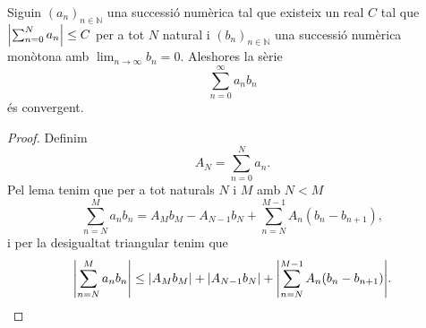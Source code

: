 \documentclass[../Apunts.tex]{subfiles}
\begin{document}
	\begin{theorem}
		\label{thm:Teorema de Dirichlet per sèries numèriques}
		Siguin \((a_{n})_{n\in\mathbb{N}}\) una successió numèrica tal que existeix un real \(C\) tal que \(\abs{\sum_{n=0}^{N}a_{n}}\leq C\) per a tot \(N\) natural i \((b_{n})_{n\in\mathbb{N}}\) una successió numèrica monòtona amb \(\lim_{n\to\infty}b_{n}=0\). Aleshores la sèrie
		\[\sum_{n=0}^{\infty}a_{n}b_{n}\]
		és convergent.
		\begin{proof}
			Definim
			\[A_{N}=\sum_{n=0}^{N}a_{n}.\]
			Pel lema  tenim que per a tot naturals \(N\) i \(M\) amb \(N<M\)
			\[\sum_{n=N}^{M}a_{n}b_{n}=A_{M}b_{M}-A_{N-1}b_{N}+\sum_{n=N}^{M-1}A_{n}(b_{n}-b_{n+1}),\]
			i per la desigualtat triangular %
			tenim que
			\begin{equation}
				\label{thm:Teorema de Dirichlet per sèries numèriques:eq1}
				\abs{\sum_{n=N}^{M}a_{n}b_{n}}\leq\abs{A_{M}b_{M}}+\abs{A_{N-1}b_{N}}+\abs{\sum_{n=N}^{M-1}A_{n}(b_{n}-b_{n+1})}.
			\end{equation}
			

\end{proof}
\end{theorem}
\end{document}
